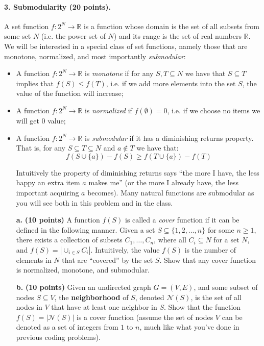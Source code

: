 \documentclass[11pt]{article}
\theoremstyle{definition} \newtheorem{Theorem}{theorem}
\begin{document}
\paragraph{3. Submodularity (20 points).}  A set function $f:2^N \to \mathbb{R}$ is a function whose domain is the set of all subsets from some set $N$ (i.e. the power set of $N$) and its range is the set of real numbers $\mathbb{R}$.  We will be interested in a special class of set functions, namely those that are monotone, normalized, and most importantly \emph{submodular}:   

\begin{itemize}
\item A function $f:2^N \to \mathbb{R}$ is  \emph{monotone} if for any $S,T\subseteq N$ we have that $S\subseteq T$ implies that $f(S) \leq f(T)$, i.e. if we add more elements into the set $S$, the value of the function will increase; 
\item A function $f:2^N \to \mathbb{R}$ is  \emph{normalized} if $f(\emptyset) = 0$, i.e. if we choose no items we will get 0 value;
\item A function $f:2^N \to \mathbb{R}$ is \emph{submodular} if it has a diminishing returns property.  That is, for any $S\subseteq T\subseteq N$ and $a\notin T$ we have that: 
%
$$f(S \cup \{a\}) - f(S)  \geq f(T \cup \{a\}) -  f(T)$$
%

Intuitively the property of diminishing returns says ``the more I have, the less happy an extra item $a$ makes me'' (or the more I already have, the less important acquiring $a$ becomes). Many natural functions are submodular as you will see both in this problem and in the class.
\end{itemize}

\begin{itemize}
\item[\textbf{a.}] \textbf{(10 points)}  A function $f(S)$ is called a \emph{cover} function if it can be defined in the following manner. Given a set $S \subseteq \{1, 2, \ldots, n\}$ for some $n \geq 1$, there exists a collection of subsets $C_{1},\ldots,C_{n}$, where all $C_i \subseteq N$ for a set $N$, and $f(S) = |\cup_{i\in S}C_i |$.  Intuitively, the value $f(S)$  is the number of elements in $N$ that are ``covered'' by the set $S$. Show that any cover function is normalized, monotone, and submodular.

\item[\textbf{b.}] \textbf{(10 points)} Given an undirected graph $G=(V,E)$, and some subset of nodes $S \subseteq V$, the \textbf{neighborhood} of $S$, denoted $\mathcal{N}(S)$, is the set of all nodes in $V$ that have at least one neighbor in $S$.  Show that the function $f(S) = |\mathcal{N}(S)|$ is a cover function (assume the set of nodes $V$ can be denoted as a set of integers from $1$ to $n$, much like what you've done in previous coding problems).

\end{itemize}
\end{document}
